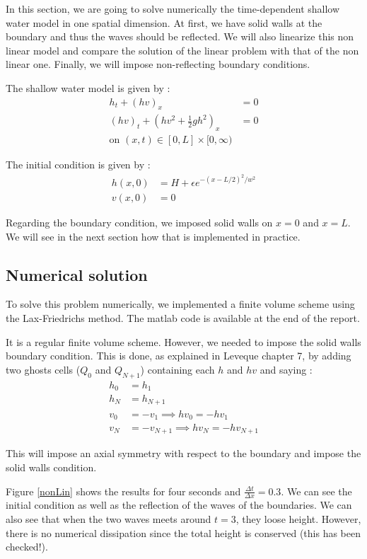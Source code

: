 In this section, we are going to solve numerically the time-dependent shallow water model in one spatial dimension. At first, we have solid walls at the boundary and thus the waves should be reflected. We will also linearize this non linear model and compare the solution of the linear problem with that of the non linear one. Finally, we will impose non-reflecting boundary conditions.

The shallow water model is given by :
\begin{align*}
h_t+(hv)_x &= 0\\
(hv)_t + (hv^2+\frac{1}{2}gh^2)_x &= 0\\
\text{on }(x,t)\in [0,L]\times [0,\infty)
\end{align*}

The initial condition is given by :
\begin{align*}
h(x,0) &= H+\epsilon e^{-(x-L/2)^2/w^2}\\
v(x,0) &= 0
\end{align*}

Regarding the boundary condition, we imposed solid walls on $x=0$ and $x=L$. We will see in the next section how that is implemented in practice.

\subsection{Numerical solution}
To solve this problem numerically, we implemented a finite volume scheme using the Lax-Friedrichs method. The matlab code is available at the end of the report.

It is a regular finite volume scheme. However, we needed to impose the solid walls boundary condition. This is done, as explained in Leveque chapter 7, by adding two ghosts cells ($Q_0$ and $Q_{N+1}$) containing each $h$ and $hv$ and saying :
\begin{align*}
h_0 &= h_1\\
h_N &= h_{N+1}\\
v_0 &= -v_1 \implies hv_0 = -hv_1\\
v_N &= -v_{N+1} \implies hv_N = -hv_{N+1}
\end{align*}

This will impose an axial symmetry with respect to the boundary and impose the solid walls condition.

Figure \ref{nonLin} shows the results for four seconds and $\frac{\Delta t}{\Delta x}=0.3$. We can see the initial condition as well as the reflection of the waves of the boundaries. We can also see that when the two waves meets around $t=3$, they loose height. However, there is no numerical dissipation since the total height is conserved (this has been checked!). 

